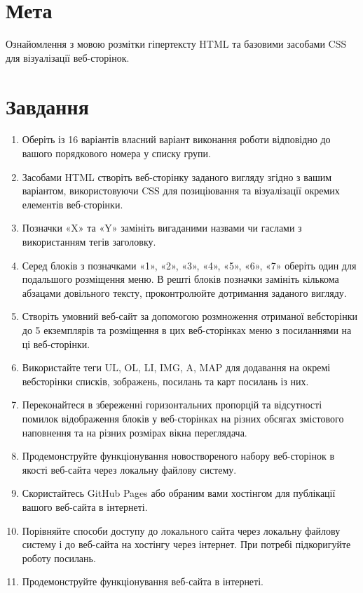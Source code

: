 \section{Мета}

Ознайомлення з мовою розмітки гіпертексту HTML та базовими засобами CSS
для візуалізації веб-сторінок.

\section{Завдання}

\begin{enumerate}
      \item Оберіть із 16 варіантів власний варіант виконання роботи відповідно до вашого порядкового номера у списку групи.
      \item Засобами HTML створіть веб-сторінку заданого вигляду згідно з вашим варіантом, використовуючи CSS для позиціювання та візуалізації окремих елементів веб-сторінки.
      \item Позначки «X» та «Y» замініть вигаданими назвами чи гаслами з використанням тегів заголовку.
      \item Серед блоків з позначками «1», «2», «3», «4», «5», «6», «7» оберіть один для подальшого розміщення меню. В решті блоків позначки замініть кількома абзацами довільного тексту, проконтролюйте дотримання заданого вигляду.
      \item Створіть умовний веб-сайт за допомогою розмноження отриманої вебсторінки до 5 екземплярів та розміщення в цих веб-сторінках меню з посиланнями на ці веб-сторінки.
      \item Використайте теги UL, OL, LI, IMG, A, MAP для додавання на окремі вебсторінки списків, зображень, посилань та карт посилань із них.
      \item Переконайтеся в збереженні горизонтальних пропорцій та відсутності помилок відображення блоків у веб-сторінках на різних обсягах змістового наповнення та на різних розмірах вікна переглядача.
      \item Продемонструйте функціонування новоствореного набору веб-сторінок в якості веб-сайта через локальну файлову систему.
      \item Скористайтесь GitHub Pages або обраним вами хостінгом для публікації вашого веб-сайта в інтернеті.
      \item Порівняйте способи доступу до локального сайта через локальну файлову систему і до веб-сайта на хостінгу через інтернет. При потребі підкоригуйте роботу посилань.
      \item Продемонструйте функціонування веб-сайта в інтернеті.
\end{enumerate}
